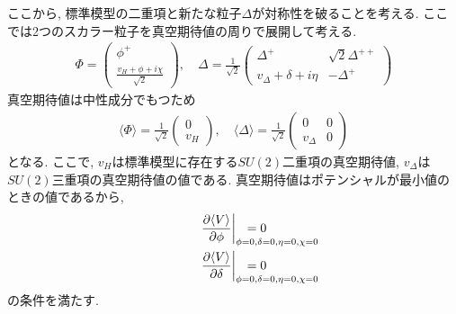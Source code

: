 ここから, 標準模型の二重項と新たな粒子$\Delta$が対称性を破ることを考える.
ここでは2つのスカラー粒子を真空期待値の周りで展開して考える.
\begin{align}
  \Phi = \begin{pmatrix}
    \phi^+ \\
    \frac{v_H + \phi  +i\chi}{\sqrt{2}}
  \end{pmatrix},\quad
  \Delta =\frac{1}{\sqrt{2}}\begin{pmatrix}
    \Delta^+ & \sqrt{2}\Delta^{++} \\
    v_\Delta + \delta + i\eta & -\Delta^+
  \end{pmatrix} \label{vev_newh}
\end{align}
真空期待値は中性成分でもつため
\begin{align}
  \langle \Phi \rangle = \frac{1}{\sqrt{2}}\begin{pmatrix}
    0 \\
    v_H
    \end{pmatrix},\quad \langle \Delta \rangle = \frac{1}{\sqrt{2}}\begin{pmatrix}
    0 & 0 \\
    v_\Delta & 0 
  \end{pmatrix}\label{vev_Higgs_delta}
\end{align}
となる.
ここで, $v_H$は標準模型に存在する$SU(2)$二重項の真空期待値, $v_\Delta$は$SU(2)$三重項の真空期待値の値である.
真空期待値はポテンシャルが最小値のときの値であるから,
\begin{align}
  \left.\frac{\partial \langle V\rangle}{\partial \phi}\right|_{\phi=0, \delta=0, \eta=0, \chi=0} \hspace{-60pt}&= 0\nonumber\\
    \left.\frac{\partial \langle V\rangle}{\partial \delta}\right|_{\phi=0, \delta=0, \eta=0, \chi=0}\hspace{-60pt} &= 0\nonumber
\end{align}
の条件を満たす.

